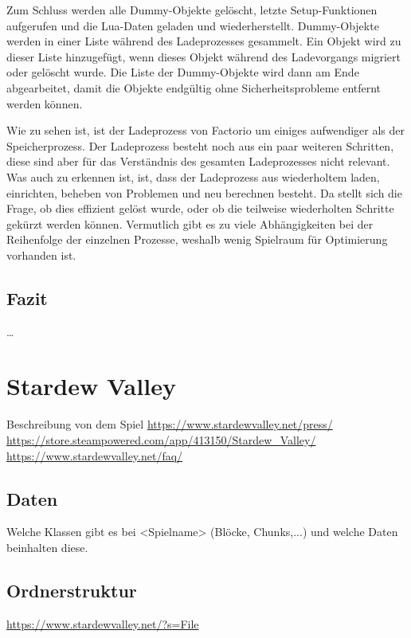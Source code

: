 Zum Schluss werden alle Dummy-Objekte gelöscht, letzte Setup-Funktionen aufgerufen und die Lua-Daten geladen und wiederherstellt. Dummy-Objekte werden in einer Liste während des Ladeprozesses gesammelt. Ein Objekt wird zu dieser Liste hinzugefügt, wenn dieses Objekt während des Ladevorgangs migriert oder gelöscht wurde. Die Liste der Dummy-Objekte wird dann am Ende abgearbeitet, damit die Objekte endgültig ohne Sicherheitsprobleme entfernt werden können.\cite{factorioGithubSaveLoad}

Wie zu sehen ist, ist der Ladeprozess von Factorio um einiges aufwendiger als der Speicherprozess. Der Ladeprozess besteht noch aus ein paar weiteren Schritten, diese sind aber für das Verständnis des gesamten Ladeprozesses nicht relevant. Was auch zu erkennen ist, ist, dass der Ladeprozess aus wiederholtem laden, einrichten, beheben von Problemen und neu berechnen besteht. Da stellt sich die Frage, ob dies effizient gelöst wurde, oder ob die teilweise wiederholten Schritte gekürzt werden können. Vermutlich gibt es zu viele Abhängigkeiten bei der Reihenfolge der einzelnen Prozesse, weshalb wenig Spielraum für Optimierung vorhanden ist.



\subsection{Fazit}
\dots



\section{Stardew Valley}
Beschreibung von dem Spiel
\url{https://www.stardewvalley.net/press/}\\
\url{https://store.steampowered.com/app/413150/Stardew_Valley/}\\
\url{https://www.stardewvalley.net/faq/}

\subsection{Daten}
Welche Klassen gibt es bei <Spielname> (Blöcke, Chunks,...) und welche Daten 
beinhalten diese.

\subsection{Ordnerstruktur}
\url{https://www.stardewvalley.net/?s=File}

